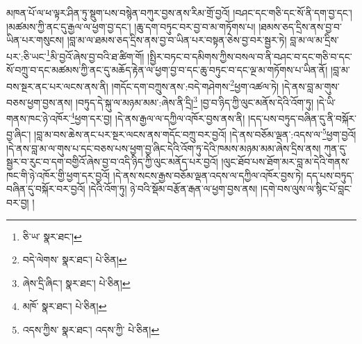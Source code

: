 མཁན་པོ་ལ་ཕ་ལྟར་ཤིན་ཏུ་སྡུག་པས་བསྙེན་བཀུར་བྱས་ནས་རིམ་གྲོ་བྱའོ། །བཤང་དང་གཅི་དང་སོ་ནི་དག་བྱ་དང་། །མཚམས་ཀྱི་ནང་དུ་རྒྱལ་ལ་ཕྱག་བྱ་དང་། །ཆུ་དག་བཏུང་བར་བྱ་བ་མ་གཏོགས་པ། །ཐམས་ཅད་དྲིས་ནས་བྱ་བ་ཡིན་པར་གསུངས། །བླ་མ་ལ་ཐམས་ཅད་དྲིས་ནས་བྱ་བ་ཡིན་པར་བསྟན་ཅེས་བྱ་བར་སྦྱར་ཏེ། བླ་མ་ལ་མ་དྲིས་པར་:ཅི་ཡང་\footnote{ཅི་ཡ་  སྣར་ཐང་། }མི་བྱའོ་ཞེས་བྱ་བའི་ཐ་ཚིག་གོ། །སྤྱིར་བཏང་བ་དམིགས་ཀྱིས་བསལ་བ་ནི་བཤང་བ་དང་གཅི་བ་དང་སོ་བཀྲུ་བ་དང་མཚམས་ཀྱི་ནང་དུ་མཆོད་རྟེན་ལ་ཕྱག་བྱ་བ་དང་ཆུ་བཏུང་བ་དང་ལྔ་མ་གཏོགས་པ་ཡིན་ནོ། །བླ་མ་བས་སྔར་ནང་པར་ལངས་ནས་ནི། །གདོང་དག་བཀྲུས་ནས་:བདེ་གཤེགས་\footnote{བདེ་ལེགས་  སྣར་ཐང་།  པེ་ཅིན། }ཕྱག་འཚལ་ཏེ། །དེ་ནས་བླ་མ་གུས་བཅས་ཕྱག་བྱས་ནས། །བཏུད་དེ་སྐུ་ལ་མཉམ་མམ་:ཞེས་ནི་དྲི།\footnote{ཞེས་དྲི་ཞིང་།  སྣར་ཐང་།  པེ་ཅིན། } །བྱ་བ་ཉིད་ཀྱི་ལུང་མནོས་དེའི་འོག་ཏུ། །དེ་ཡི་གནས་ཁང་ཉེ་འཁོར་\footnote{མཁོ་  སྣར་ཐང་།  པེ་ཅིན། }ཕྱག་དར་བྱ། །དེ་ནས་རྒྱལ་ལ་དཀྱིལ་འཁོར་བྱས་ནས་ནི། །དད་པས་བཏུད་བཞིན་དུ་ནི་བསྐོར་བྱ་ཞིང་། །བླ་མ་བས་ཆེས་ནང་པར་སྔར་ལངས་ནས་གདོང་བཀྲུ་བར་བྱའོ། །དེ་ནས་བཅོམ་ལྡན་:འདས་ལ་\footnote{འདས་ཀྱིས་  སྣར་ཐང་། འདས་ཀྱི་  པེ་ཅིན། }ཕྱག་བྱའོ། །དེ་ནས་བླ་མ་ལ་གུས་པ་དང་བཅས་པས་ཕྱག་བྱ་ཞིང་དེའི་འོག་ཏུ་དེའི་ཁམས་མཉམ་མམ་ཞེས་དྲིས་ནས། ཀུན་དུ་སྦྱར་བ་རུང་བ་དག་བགྱིའོ་ཞེས་བྱ་བ་འདི་ཉིད་ཀྱི་ལུང་མནོད་པར་བྱའོ། །ལུང་ཐོབ་པས་ཐོག་མར་བླ་མ་དེའི་གནས་ཁང་གི་ཉེ་འཁོར་གྱི་ཕྱག་དར་བྱའོ། །དེ་ནས་སངས་རྒྱས་བཅོམ་ལྡན་འདས་ལ་དཀྱིལ་འཁོར་བྱས་ཏེ། དད་པས་བཏུད་བཞིན་དུ་བསྐོར་བར་བྱའོ། །དེའི་འོག་ཏུ། ཉེ་བའི་སྡོམ་བརྩོན་རྒན་ལ་ཕྱག་བྱས་ནས། །དགེ་བས་ལུས་ལ་སྙིང་པོ་བླང་བར་བྱ། །
